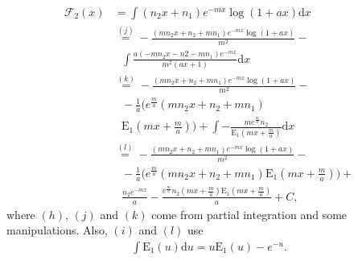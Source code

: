 \begin{align}
     \mathcal{F}_2(x)& =  \int (n_2x+n_1)e^{-mx}\log(1+ax) \text{d}x\nonumber\\
    &\overset{(j)} = -\frac{(mn_2x+n_2+mn_1)e^{-mx}\log(1+ax)}{m^2} - \nonumber\\
    &~~~\int \frac{a(-mn_2x-n2-mn_1)e^{-mx}}{m^2(ax+1)} \text{d}x\nonumber\\
    & \overset{(k)}= -\frac{(mn_2x+n_2+mn_1)e^{-mx}\log(1+ax)}{m^2} - \nonumber\\
    &~~~ -\frac{1}{a}\bigg(e^{\frac{m}{a}}(mn_2x+n_2+mn_1)\nonumber\\
    &~~~ \operatorname{E_1}\left(mx+\frac{m}{a}\right)\bigg)+
    \int - \frac{me^{\frac{m}{a}}n_2}{\operatorname{E_1}\left(mx+\frac{m}{a}\right)} \text{d}x\nonumber\\
    & \overset{(l)}= -\frac{(mn_2x+n_2+mn_1)e^{-mx}\log(1+ax)}{m^2} - \nonumber\\
    &~~~ -\frac{1}{a}\bigg(e^{\frac{m}{a}}(mn_2x+n_2+mn_1) \operatorname{E_1}\left(mx+\frac{m}{a}\right)\bigg)+\nonumber\\
    &~~~  \frac{n_2e^{-mx}}{a} - \frac{e^{\frac{m}{a}}n_2(mx+\frac{m}{a}) \operatorname{E_1}\left(mx+\frac{m}{a}\right)}{a}+C,
\end{align}
where $(h)$, $(j)$ and $(k)$ come from partial integration and some manipulations. Also, $(i)$ and $(l)$ use \cite[p. 195]{geller1969table}
\begin{align}
    \int \operatorname{E_1}(u) \text{d}u = u\operatorname{E_1}(u)-e^{-u}.
\end{align}








